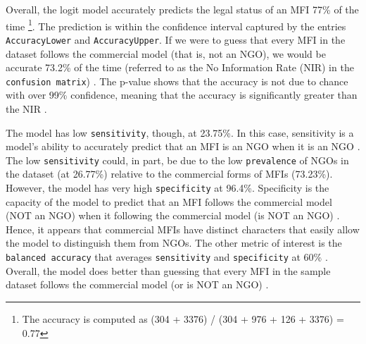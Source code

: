 \documentclass[a4paper, nobind]{templates/ociamthesis}
\begin{document}
Overall, the logit model accurately predicts the legal status of an MFI 77\% of the time \footnote{The accuracy is computed as (304 + 3376) / (304 + 976 + 126 + 3376) = 0.77}. The prediction is within the confidence interval captured by the entries \texttt{AccuracyLower} and \texttt{AccuracyUpper}. If we were to guess that every MFI in the dataset follows the commercial model (that is, not an NGO), we would be accurate 73.2\% of the time (referred to as the No Information Rate (NIR) in the \texttt{confusion\ matrix}) \autocite{cavalin2018confusion}. The p-value shows that the accuracy is not due to chance with over 99\% confidence, meaning that the accuracy is significantly greater than the NIR \autocite{kleinbaum2002logistic}.

The model has low \texttt{sensitivity}, though, at 23.75\%. In this case, sensitivity is a model's ability to accurately predict that an MFI is an NGO when it is an NGO \autocite{marom2010using}. The low \texttt{sensitivity} could, in part, be due to the low \texttt{prevalence} of NGOs in the dataset (at 26.77\%) relative to the commercial forms of MFIs (73.23\%). However, the model has very high \texttt{specificity} at 96.4\%. Specificity is the capacity of the model to predict that an MFI follows the commercial model (NOT an NGO) when it following the commercial model (is NOT an NGO) \autocite{zeng2020confusion}. Hence, it appears that commercial MFIs have distinct characters that easily allow the model to distinguish them from NGOs. The other metric of interest is the \texttt{balanced\ accuracy} that averages \texttt{sensitivity} and \texttt{specificity} at 60\% \autocite{gorzalczany2016multi}. Overall, the model does better than guessing that every MFI in the sample dataset follows the commercial model (or is NOT an NGO) \autocite{hosmer2013applied}.
\end{document}
